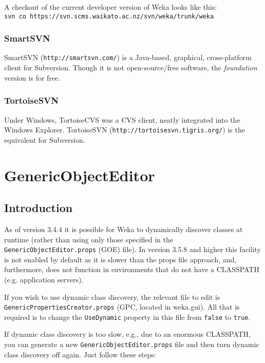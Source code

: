 \noindent A checkout of the current developer version of Weka looks like this:\\

\verb=svn co https://svn.scms.waikato.ac.nz/svn/weka/trunk/weka=\\

\subsubsection*{SmartSVN}
SmartSVN (\verb=http://smartsvn.com/=) is a Java-based, graphical,
cross-platform client for Subversion. Though it is not
open-source/free software, the \textit{foundation} version is for free.

\subsubsection*{TortoiseSVN}
Under Windows, TortoiseCVS was a CVS client, neatly integrated into
the Windows Explorer. TortoiseSVN
(\verb=http://tortoisesvn.tigris.org/=) is the equivalent for
Subversion.


\section{GenericObjectEditor}

\subsection{Introduction}
As of version 3.4.4 it is possible for Weka to dynamically discover
classes at runtime (rather than using only those specified in the
\verb=GenericObjectEditor.props= (GOE) file). In version 3.5.8 and higher
this facility is not enabled by default as it is slower than the props file
approach, and, furthermore, does not function in environments that do
not have a CLASSPATH (e.g. application servers).

If you wish to use dynamic class discovery, the relevant file to edit
is\\ \verb=GenericPropertiesCreator.props= (GPC, located in
weka.gui). All that is required is to change the \verb=UseDynamic=
property in this file from \verb=false= to \verb=true=.

If dynamic class discovery is too slow, e.g., due to an enormous CLASSPATH, you can
generate a new \verb=GenericObjectEditor.props= file and then turn dynamic
class discovery off again. Just follow these steps:

